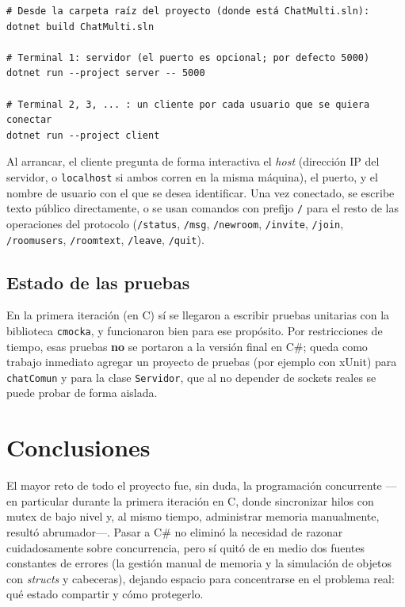 \documentclass[11pt,letterpaper]{article}
\begin{document}
\begin{verbatim}
# Desde la carpeta raíz del proyecto (donde está ChatMulti.sln):
dotnet build ChatMulti.sln

# Terminal 1: servidor (el puerto es opcional; por defecto 5000)
dotnet run --project server -- 5000

# Terminal 2, 3, ... : un cliente por cada usuario que se quiera conectar
dotnet run --project client
\end{verbatim}

Al arrancar, el cliente pregunta de forma interactiva el \emph{host}
(dirección IP del servidor, o \texttt{localhost} si ambos corren en la
misma máquina), el puerto, y el nombre de usuario con el que se desea
identificar. Una vez conectado, se escribe texto público directamente, o
se usan comandos con prefijo \texttt{/} para el resto de las operaciones
del protocolo (\texttt{/status}, \texttt{/msg}, \texttt{/newroom},
\texttt{/invite}, \texttt{/join}, \texttt{/roomusers}, \texttt{/roomtext},
\texttt{/leave}, \texttt{/quit}).

\subsection{Estado de las pruebas}

En la primera iteración (en C) sí se llegaron a escribir pruebas unitarias
con la biblioteca \texttt{cmocka}, y funcionaron bien para ese propósito.
Por restricciones de tiempo, esas pruebas \textbf{no} se portaron a la
versión final en C\#; queda como trabajo inmediato agregar un proyecto de
pruebas (por ejemplo con xUnit) para \texttt{chatComun} y para la clase
\texttt{Servidor}, que al no depender de sockets reales se puede probar
de forma aislada.

\section{Conclusiones}

El mayor reto de todo el proyecto fue, sin duda, la programación
concurrente —en particular durante la primera iteración en C, donde
sincronizar hilos con mutex de bajo nivel y, al mismo tiempo, administrar
memoria manualmente, resultó abrumador—. Pasar a C\# no eliminó la
necesidad de razonar cuidadosamente sobre concurrencia, pero sí quitó de
en medio dos fuentes constantes de errores (la gestión manual de memoria y
la simulación de objetos con \emph{structs} y cabeceras), dejando espacio
para concentrarse en el problema real: qué estado compartir y cómo
protegerlo.
\end{document}

